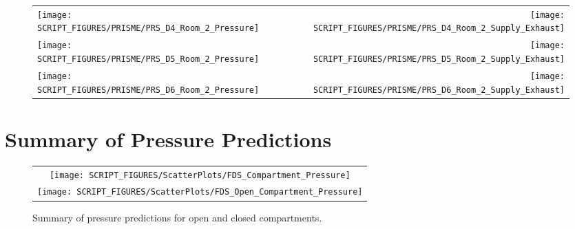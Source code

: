 \begin{figure}[p]
\begin{tabular*}{\textwidth}{l@{\extracolsep{\fill}}r}
\texttt{[image: SCRIPT\_FIGURES/PRISME/PRS\_D4\_Room\_2\_Pressure]} &
\texttt{[image: SCRIPT\_FIGURES/PRISME/PRS\_D4\_Room\_2\_Supply\_Exhaust]} \\
\texttt{[image: SCRIPT\_FIGURES/PRISME/PRS\_D5\_Room\_2\_Pressure]} &
\texttt{[image: SCRIPT\_FIGURES/PRISME/PRS\_D5\_Room\_2\_Supply\_Exhaust]} \\
\texttt{[image: SCRIPT\_FIGURES/PRISME/PRS\_D6\_Room\_2\_Pressure]} &
\texttt{[image: SCRIPT\_FIGURES/PRISME/PRS\_D6\_Room\_2\_Supply\_Exhaust]}
\end{tabular*}
\label{PRISME_Room_2_Pressure_4-6}
\end{figure}


\clearpage

\section{Summary of Pressure Predictions}
\label{Compartment Over-Pressure}
\label{Open Compartment Over-Pressure}


\begin{figure}[h!]
\begin{center}
\begin{tabular}{c}
\texttt{[image: SCRIPT\_FIGURES/ScatterPlots/FDS\_Compartment\_Pressure]} \\
\texttt{[image: SCRIPT\_FIGURES/ScatterPlots/FDS\_Open\_Compartment\_Pressure]}
\end{tabular}
\end{center}
\caption[Summary of pressure predictions]{Summary of pressure predictions for open and closed compartments.}
\label{Pressure_Summary}
\end{figure}

